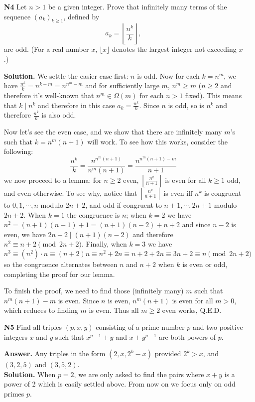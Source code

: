 \documentclass[11pt,a4paper]{article}
\begin{document}
\begin{enumerate}
	\item[\textbf{N4}] Let $n > 1$ be a given integer. Prove that infinitely many terms of the sequence $(a_k )_{k\ge 1}$, defined by \[a_k=\left\lfloor\frac{n^k}{k}\right\rfloor,\] are odd. (For a real number $x$, $\lfloor x\rfloor$ denotes the largest integer not exceeding $x$.)
	
	\textbf{Solution.} We settle the easier case first: $n$ is odd. Now for each $k=n^m$, we have $\frac{n^k}{k}=n^{k-m}=n^{n^m-m}$ and for sufficiently large $m$, $n^m\ge m$ ($n\ge 2$ and therefore it's well-known that $n^m\in \Omega(m)$ for each $n>1$ fixed). This means that $k\mid n^k$ and therefore in this case $a_k=\frac{n^k}{k}$. Since $n$ is odd, so is $n^k$ and therefore $\frac{n^k}{k}$ is also odd. 
	
	Now let's see the even case, and we show that there are infinitely many $m$'s such that $k=n^m(n+1)$ will work. To see how this works, consider the following: 
	\[
	\frac{n^k}{k} = \frac{n^{n^m(n+1)}}{n^m(n+1)}
	=\frac{n^{n^m(n+1)-m}}{n+1}
	\]
	we now proceed to a lemma: for $n\ge 2$ even, $\left\lfloor\frac{n^k}{n+1}\right\rfloor$ is even for all $k\ge 1$ odd, and even otherwise. To see why, notice that $\left\lfloor\frac{n^k}{n+1}\right\rfloor$ is even iff $n^k$ is congruent to $0, 1, \cdots , n$ modulo $2n+2$, and odd if congruent to $n+1, \cdots , 2n+1$ modulo $2n+2$. 
	When $k=1$ the congruence is $n$; when $k=2$ we have $n^2=(n+1)(n-1)+1=(n+1)(n-2)+n+2$ and since $n-2$ is even, we have $2n+2\mid (n+1)(n-2)$ and therefore $n^2\equiv n+2\pmod{2n+2}$. 
	Finally, when $k=3$ we have \[n^3\equiv (n^2)\cdot n\equiv (n+2)n\equiv n^2+2n\equiv n+2+2n\equiv 3n+2\equiv n\pmod{2n+2}\]
	so the congruence alternates between $n$ and $n+2$ when $k$ is even or odd, completing the proof for our lemma. 
	
	To finish the proof, we need to find those (infinitely many) $m$ such that $n^m(n+1)-m$ is even. Since $n$ is even, $n^m(n+1)$ is even for all $m>0$, which reduces to finding $m$ is even. Thus all $m\ge 2$ even works, Q.E.D. 
	
	\item[\textbf{N5}] Find all triples $(p, x, y)$ consisting of a prime number $p$ and two positive integers $x$ and $y$ such that $x^{p -1} + y$ and $x + y^ {p -1}$ are both powers of $p$.
	
	\textbf{Answer.} Any triples in the form $(2, x, 2^k-x)$ provided $2^k>x$, and $(3, 2, 5)$ and $(3, 5, 2)$. \\
	\textbf{Solution.} When $p=2$, we are only asked to find the pairs where $x+y$ is a power of 2 which is easily settled above. From now on we focus only on odd primes $p$. 
	

\end{enumerate}
\end{document}
